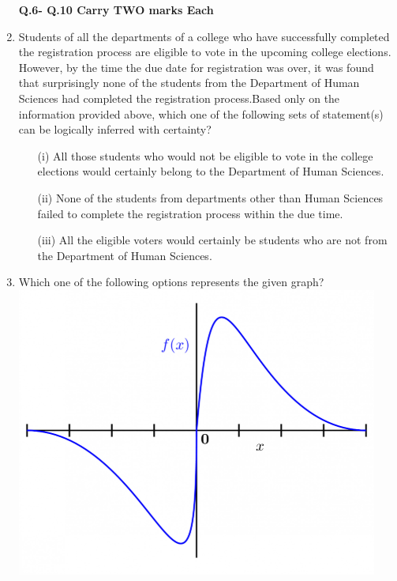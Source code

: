 \documentclass[12pt]{article}
\theoremstyle{remark}
\begin{document}
\begin{enumerate}
\begin{enumerate}  \end{enumerate}
\hfill{}
\newpage
\textbf{Q.6- Q.10 Carry TWO marks Each} 
\item Students of all the departments of a college who have successfully completed the registration process are eligible to vote in the upcoming college elections. However, by the time the due date for registration was over, it was found that surprisingly none of the students from the Department of Human Sciences had completed the registration process.Based only on the information provided above, which one of the following sets of statement(s) can be logically inferred with certainty?
\begin{enumerate}
\item [(i)] All those students who would not be eligible to vote in the college elections would certainly belong to the Department of Human Sciences.
\item [(ii)] None of the students from departments other than Human Sciences failed to complete the registration process within the due time.
\item [(iii)] All the eligible voters would certainly be students who are not from the Department of Human Sciences.
\end{enumerate} 
\begin{enumerate}  \end{enumerate}
\hfill{}
\item  Which one of the following options represents the given graph?\\ 
 \includegraphics{Figs/Q7.png} \\ 

\end{enumerate}
\end{document}
